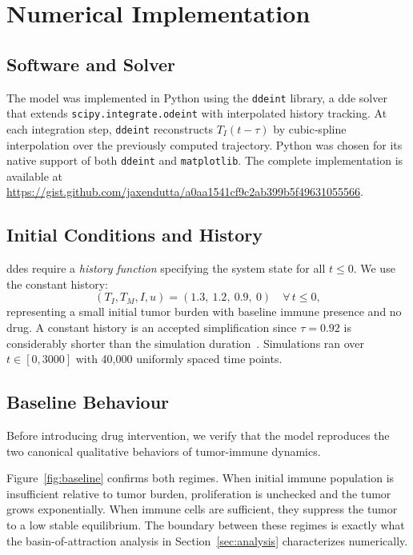 \section{Numerical Implementation}
\label{sec:implementation}

\subsection{Software and Solver}

The model was implemented in Python using the \texttt{ddeint} library, a \gls{dde} solver that extends \texttt{scipy.integrate.odeint} with interpolated history tracking. At each integration step, \texttt{ddeint} reconstructs $T_I(t - \tau)$ by cubic-spline interpolation over the previously computed trajectory. Python was chosen for its native support of both \texttt{ddeint} and \texttt{matplotlib}. The complete implementation is available at \url{https://gist.github.com/jaxendutta/a0aa1541cf9c2ab399b5f49631055566}.

\subsection{Initial Conditions and History}

\gls{dde}s require a \emph{history function} specifying the system state for all
$t \leq 0$. We use the constant history:
\[
  (T_I, T_M, I, u) = (1.3,\ 1.2,\ 0.9,\ 0) \quad \forall\, t \leq 0,
\]
representing a small initial tumor burden with baseline immune presence and no drug. A constant history is an accepted simplification since $\tau = 0.92$ is considerably shorter than the simulation duration~\cite{villasana2004}. Simulations ran over $t \in [0, 3000]$ with 40,000 uniformly spaced time points.

\subsection{Baseline Behaviour}

Before introducing drug intervention, we verify that the model reproduces the two canonical qualitative behaviors of tumor-immune dynamics.

Figure~\ref{fig:baseline} confirms both regimes. When initial immune population is insufficient relative to tumor burden, proliferation is unchecked and the tumor grows exponentially. When immune cells are sufficient, they suppress the tumor to a low stable equilibrium. The boundary between these regimes is exactly what the basin-of-attraction analysis in Section~\ref{sec:analysis} characterizes numerically.

